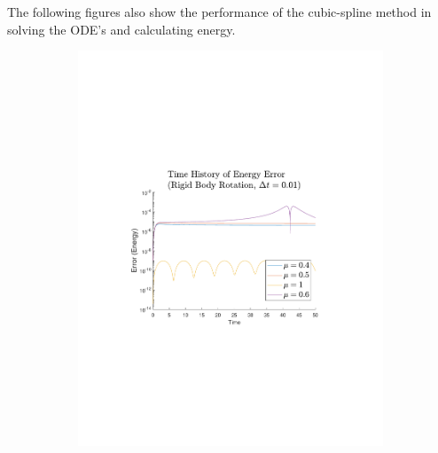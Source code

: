 \documentclass{article}
\begin{document}
The following figures also show the performance of the cubic-spline method in solving the ODE's and calculating energy.
\begin{figure}[H]
\centering
\begin{subfigure}{0.45\linewidth}
\includegraphics[trim={1.5in, 3in, 1.5in, 3in}, clip, width=0.95\linewidth]{newtonEnergyError}
\caption{}\label{fig:newtonEnergy}
\end{subfigure}
\begin{subfigure}{0.45\linewidth}

\end{subfigure}
\end{figure}
\end{document}
